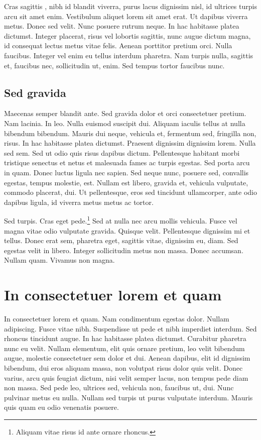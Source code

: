 \documentclass{cascadilla}
\begin{document}
Cras sagittis \cite{Shannon1948}, nibh id blandit viverra, purus lacus
dignissim nisl, id ultrices turpis arcu sit amet enim. Vestibulum aliquet
lorem sit amet erat. Ut dapibus viverra metus. Donec sed velit. Nunc posuere
rutrum neque. In hac habitasse platea dictumst. Integer placerat, risus vel
lobortis sagittis, nunc augue dictum magna, id consequat lectus metus vitae
felis. Aenean porttitor pretium orci. Nulla faucibus. Integer vel enim eu
tellus interdum pharetra.  Nam turpis nulla, sagittis et, faucibus nec,
sollicitudin ut, enim. Sed tempus tortor faucibus nunc.

\subsection{Sed gravida}
Maecenas semper blandit ante. Sed gravida dolor et orci consectetuer pretium.
Nam lacinia. In leo. Nulla euismod suscipit dui. Aliquam iaculis tellus at
nulla bibendum bibendum. Mauris dui neque, vehicula et, fermentum sed,
fringilla non, risus. In hac habitasse platea dictumst. Praesent dignissim
dignissim lorem. Nulla sed sem. Sed ut odio quis risus dapibus dictum.
Pellentesque habitant morbi tristique senectus et netus et malesuada fames ac
turpis egestas. Sed porta arcu in quam. Donec luctus ligula nec sapien. Sed
neque nunc, posuere sed, convallis egestas, tempus molestie, est. Nullam est
libero, gravida et, vehicula vulputate, commodo placerat, dui. Ut
pellentesque, eros sed tincidunt ullamcorper, ante odio dapibus ligula, id
viverra metus metus ac tortor.

Sed turpis. Cras eget pede.\footnote{Aliquam vitae risus id ante ornare
rhoncus.} Sed at nulla nec arcu mollis vehicula. Fusce vel magna vitae odio
vulputate gravida.  Quisque velit. Pellentesque dignissim mi et tellus. Donec
erat sem, pharetra eget, sagittis vitae, dignissim eu, diam. Sed egestas velit
in libero. Integer sollicitudin metus non massa. Donec accumsan. Nullam quam.
Vivamus non magna.

\section{In consectetuer lorem et quam}
{}

In consectetuer lorem et quam. Nam condimentum egestas dolor. Nullam
adipiscing. Fusce vitae nibh. Suspendisse ut pede et nibh imperdiet interdum.
Sed rhoncus tincidunt augue. In hac habitasse platea dictumst. Curabitur
pharetra nunc eu velit. Nullam elementum, elit quis ornare pretium, leo velit
bibendum augue, molestie consectetuer sem dolor et dui. Aenean dapibus, elit
id dignissim bibendum, dui eros aliquam massa, non volutpat risus dolor quis
velit. Donec varius, arcu quis feugiat dictum, nisi velit semper lacus, non
tempus pede diam non massa. Sed pede leo, ultrices sed, vehicula non, faucibus
ut, dui. Nunc pulvinar metus eu nulla. Nullam sed turpis ut purus vulputate
interdum. Mauris quis quam eu odio venenatis posuere. 
\end{document}
